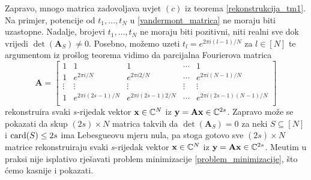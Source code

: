 \documentclass[a4paper,twoside,12pt]{memoir} %
\newcommand{\vect}[1]{\mathbf{#1}}
\renewcommand{\vec}{\vect}
\newcommand{\card}{\text{\normalfont{card}}}
\begin{document}
\indent Zapravo, mnogo matrica zadovoljava uvjet $(c)$ iz teorema \ref{rekonstrukcija_tm1}. Na primjer, potencije od $t_1,\dots,t_N$ u \eqref{vandermont_matrica} ne moraju biti uzastopne. Nadalje, brojevi $t_1,\dots,t_N$ ne moraju biti pozitivni, niti realni sve dok vrijedi $\det(\vec A_S) \neq 0$. Posebno, mo\v{z}emo uzeti $t_l = e^{2\pi i (l-1)/N}$ za $l \in [N]$ te argumentom iz pro\v{s}log teorema vidimo da parcijalna Fourierova matrica
\begin{equation*}
   \vec A = 
   \begin{bmatrix*}
       1 & 1 & 1 & \cdots & 1 \\
       1 & e^{2 \pi i/ N} & e^{2 \pi i2/ N} & \cdots & e^{2 \pi i(N-1)/ N} \\ 
       \vdots & \vdots & \vdots & \vdots & \vdots \\ 
       1 & e^{2 \pi i(2s-1)/ N} & e^{2 \pi i(2s-1)2/ N} & \cdots & e^{2 \pi i(2s-1)(N-1)/ N} \\ 
   \end{bmatrix*}
\end{equation*}
rekonstruira svaki $s$-rijedak vektor $\vec x \in \C^N$ iz $\vec y = \vec{Ax} \in \C^{2s}$.
Zapravo mo\v{z}e se pokazati da skup $(2s) \times N$ matrica takvih da $\det(\vec A_S) = 0$ za neki $S \subseteq [N]$ i $\card(S) \leq 2s$ ima Lebesgueovu mjeru nula, pa stoga gotovo sve $(2s) \times N$ matrice rekonstruiraju svaki $s$-rijedak vektor $\vec x \in \C^N$ iz $\vec y = \vec{Ax} \in \C^{2s}$. Me\dj utim u praksi nije isplativo rje\v{s}avati problem minimizacije \eqref{problem_minimizacije}, \v{s}to \'cemo kasnije i pokazati.
\end{document}
